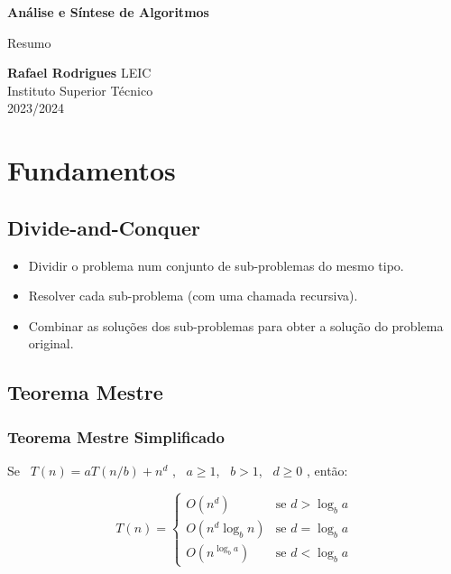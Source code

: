 \documentclass[11pt]{article}
\newcommand{\threepartdef}[6]
{ \displaystyle
	\left\{
		\begin{array}{ll}
			#1 & \mbox{se } #2 \\
			#3 & \mbox{se } #4 \\
            #5 & \mbox{se } #6
		\end{array}
	\right.
}
\begin{document}
\begin{titlepage}
    \begin{center}
        \vspace*{1cm}

        \textbf{\LARGE Análise e Síntese de Algoritmos}
        \vspace{0.5cm}

        \Large Resumo
        \vspace{1.5cm}

        \textbf{Rafael Rodrigues}
        \vfill
        LEIC \\
        Instituto Superior Técnico \\
        2023/2024
    \end{center}
\end{titlepage}

\tableofcontents

\newpage

\section{Fundamentos} 

\subsection{Divide-and-Conquer}

\begin{itemize}
    \item Dividir o problema num conjunto de sub-problemas do mesmo tipo.
    \item Resolver cada sub-problema (com uma chamada recursiva).
    \item Combinar as soluções dos sub-problemas para obter a solução do
          problema original.
\end{itemize}

\subsection{Teorema Mestre}

\subsubsection{Teorema Mestre Simplificado}

Se \ $T(n) = aT(n/b) + n^d$ , \ $a \ge 1$, \ $b > 1$, \ $d \ge 0$ , então:

\begin{equation*}
    T(n) = \threepartdef{O(n^d)}{d > \log_ba}
    {O(n^d \log_bn)}{d = \log_ba}
    {O(n^{\log_ba})}{d < \log_ba}
\end{equation*}
\end{document}
